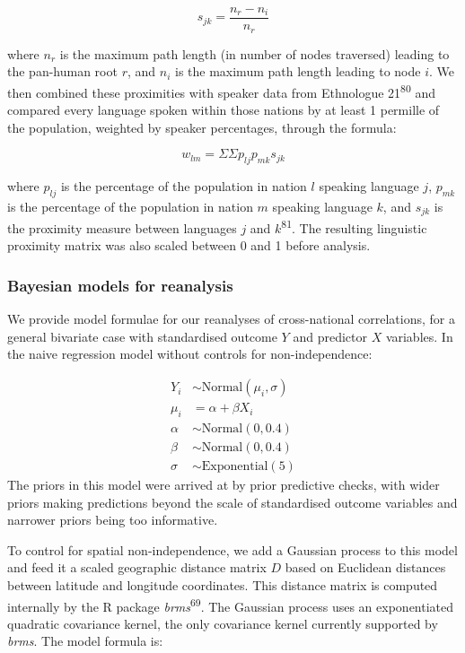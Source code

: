 \documentclass[english,man,floatsintext]{apa6}
\begin{document}
\[
s_{jk} = \frac{n_{r}-n_{i}}{n_{r}}
\]

where \(n_{r}\) is the maximum path length (in number of nodes traversed) leading to the pan-human root \(r\), and \(n_{i}\) is the maximum path length leading to node \(i\). We then combined these proximities with speaker data from Ethnologue 21\textsuperscript{80} and compared every language spoken within those nations by at least 1 permille of the population, weighted by speaker percentages, through the formula:

\[
w_{lm} = {\Sigma}{\Sigma}p_{lj}p_{mk}s_{jk}
\]

where \(p_{lj}\) is the percentage of the population in nation \(l\) speaking language \(j\), \(p_{mk}\) is the percentage of the population in nation \(m\) speaking language \(k\), and \(s_{jk}\) is the proximity measure between languages \(j\) and \(k\)\textsuperscript{81}. The resulting linguistic proximity matrix was also scaled between 0 and 1 before analysis.

\hypertarget{bayesian-models-for-reanalysis}{%
\subsubsection{Bayesian models for reanalysis}\label{bayesian-models-for-reanalysis}}

We provide model formulae for our reanalyses of cross-national correlations, for a general bivariate case with standardised outcome \(Y\) and predictor \(X\) variables. In the naive regression model without controls for non-independence:

\[
\begin{aligned}
Y_{i} &\sim \text{Normal}(\mu_{i},\sigma) \\
\mu_{i} &= \alpha + \beta X_{i} \\
\alpha &\sim \text{Normal}(0, 0.4) \\
\beta &\sim \text{Normal}(0, 0.4) \\
\sigma &\sim \text{Exponential}(5)
\end{aligned}
\]
The priors in this model were arrived at by prior predictive checks, with wider priors making predictions beyond the scale of standardised outcome variables and narrower priors being too informative.

\newpage

To control for spatial non-independence, we add a Gaussian process to this model and feed it a scaled geographic distance matrix \(D\) based on Euclidean distances between latitude and longitude coordinates. This distance matrix is computed internally by the R package \emph{brms}\textsuperscript{69}. The Gaussian process uses an exponentiated quadratic covariance kernel, the only covariance kernel currently supported by \emph{brms}. The model formula is:
\end{document}
